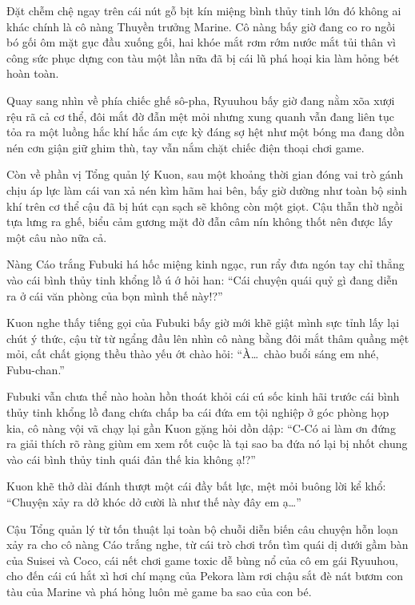 \documentclass[../main.tex]{subfiles}
\begin{document}

Đặt chễm chệ ngay trên cái nút gỗ bịt kín miệng bình thủy tinh lớn đó không ai khác chính là cô nàng Thuyền trưởng Marine. Cô nàng bấy giờ đang co ro ngồi bó gối ôm mặt gục đầu xuống gối, hai khóe mắt rơm rớm nước mắt tủi thân vì công sức phục dựng con tàu một lần nữa đã bị cái lũ phá hoại kia làm hỏng bét hoàn toàn.

Quay sang nhìn về phía chiếc ghế sô-pha, Ryuuhou bấy giờ đang nằm xõa xượi rệu rã cả cơ thể, đôi mắt đờ đẫn mệt mỏi nhưng xung quanh vẫn đang liên tục tỏa ra một luồng hắc khí hắc ám cực kỳ đáng sợ hệt như một bóng ma đang dồn nén cơn giận giữ ghim thù, tay vẫn nắm chặt chiếc điện thoại chơi game.

Còn về phần vị Tổng quản lý Kuon, sau một khoảng thời gian đóng vai trò gánh chịu áp lực làm cái van xả nén kìm hãm hai bên, bấy giờ dường như toàn bộ sinh khí trên cơ thể cậu đã bị hút cạn sạch sẽ không còn một giọt. Cậu thẫn thờ ngồi tựa lưng ra ghế, biểu cảm gương mặt đờ đẫn câm nín không thốt nên được lấy một câu nào nữa cả.

Nàng Cáo trắng Fubuki há hốc miệng kinh ngạc, run rẩy đưa ngón tay chỉ thẳng vào cái bình thủy tinh khổng lồ ú ớ hỏi han: ``Cái chuyện quái quỷ gì đang diễn ra ở cái văn phòng của bọn mình thế này!?''

\omk

Kuon nghe thấy tiếng gọi của Fubuki bấy giờ mới khẽ giật mình sực tỉnh lấy lại chút ý thức, cậu từ từ ngẩng đầu lên nhìn cô nàng bằng đôi mắt thâm quầng mệt mỏi, cất chất giọng thều thào yếu ớt chào hỏi: ``À\dots\ chào buổi sáng em nhé, Fubu-chan.''

Fubuki vẫn chưa thể nào hoàn hồn thoát khỏi cái cú sốc kinh hãi trước cái bình thủy tinh khổng lồ đang chứa chấp ba cái đứa em tội nghiệp ở góc phòng họp kia, cô nàng vội vã chạy lại gần Kuon gặng hỏi dồn dập: ``C-Có ai làm ơn đứng ra giải thích rõ ràng giùm em xem rốt cuộc là tại sao ba đứa nó lại bị nhốt chung vào cái bình thủy tinh quái đản thế kia không ạ!?''

Kuon khẽ thở dài đánh thượt một cái đầy bất lực, mệt mỏi buông lời kể khổ: ``Chuyện xảy ra dở khóc dở cười là như thế này đây em ạ\dots''

Cậu Tổng quản lý từ tốn thuật lại toàn bộ chuỗi diễn biến câu chuyện hỗn loạn xảy ra cho cô nàng Cáo trắng nghe, từ cái trò chơi trốn tìm quái dị dưới gầm bàn của Suisei và Coco, cái nết chơi game toxic dễ bùng nổ của cô em gái Ryuuhou, cho đến cái cú hắt xì hơi chí mạng của Pekora làm rơi chậu sắt đè nát bươm con tàu của Marine và phá hỏng luôn mẻ game ba sao của con bé.
\end{document}
